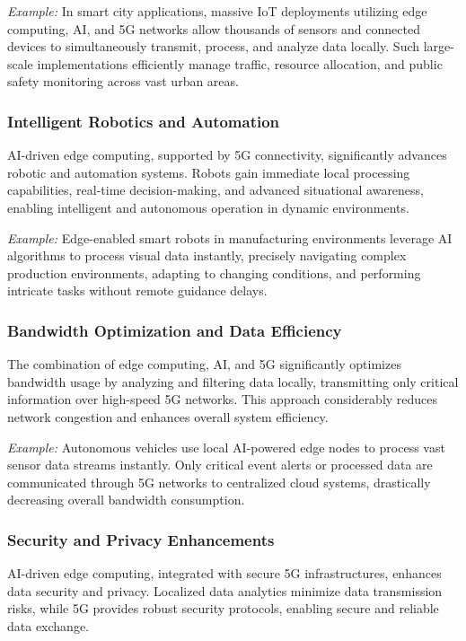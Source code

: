 \documentclass[runningheads]{llncs}
\begin{document}
\textit{Example:} In smart city applications, massive IoT deployments utilizing edge computing, AI, and 5G networks allow thousands of sensors and connected devices to simultaneously transmit, process, and analyze data locally. Such large-scale implementations efficiently manage traffic, resource allocation, and public safety monitoring across vast urban areas.

\subsubsection{Intelligent Robotics and Automation}
AI-driven edge computing, supported by 5G connectivity, significantly advances robotic and automation systems. Robots gain immediate local processing capabilities, real-time decision-making, and advanced situational awareness, enabling intelligent and autonomous operation in dynamic environments.

\textit{Example:} Edge-enabled smart robots in manufacturing environments leverage AI algorithms to process visual data instantly, precisely navigating complex production environments, adapting to changing conditions, and performing intricate tasks without remote guidance delays.

\subsubsection{Bandwidth Optimization and Data Efficiency}
The combination of edge computing, AI, and 5G significantly optimizes bandwidth usage by analyzing and filtering data locally, transmitting only critical information over high-speed 5G networks. This approach considerably reduces network congestion and enhances overall system efficiency.

\textit{Example:} Autonomous vehicles use local AI-powered edge nodes to process vast sensor data streams instantly. Only critical event alerts or processed data are communicated through 5G networks to centralized cloud systems, drastically decreasing overall bandwidth consumption.

\subsubsection{Security and Privacy Enhancements}
AI-driven edge computing, integrated with secure 5G infrastructures, enhances data security and privacy. Localized data analytics minimize data transmission risks, while 5G provides robust security protocols, enabling secure and reliable data exchange.
\end{document}

